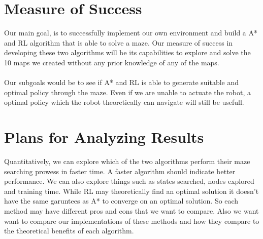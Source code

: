 \documentclass[11pt]{article}
\begin{document}
\section{Measure of Success}


Our main goal, is to successfully implement our own environment and build a A*
and RL algorithm that is able to solve a maze. Our measure of success in
developing these two algorithms will be its capabilities to explore and solve
the 10 maps we created without any prior knowledge of any of the maps.
\\
\\
Our subgoals would be to see if A* and RL is able to generate suitable and optimal policy through the maze. 
Even if we are unable to actuate the robot, a optimal policy which the robot theoretically can navigate will still be usefull. 

\section{Plans for Analyzing Results}


Quantitatively, we can explore which of the two algorithms perform their maze searching prowess 
in faster time. A faster algorithm should indicate better performance. We can also explore things 
such as states searched, nodes explored and training time. While RL may theoretically find an optimal
solution it doesn't have the same garuntees as A* to converge on an optimal solution. So each method 
may have different pros and cons that we want to compare. Also we want want to compare our implementations
of these methods and how they compare to the theoretical benefits of each algorithm. 
\end{document}
